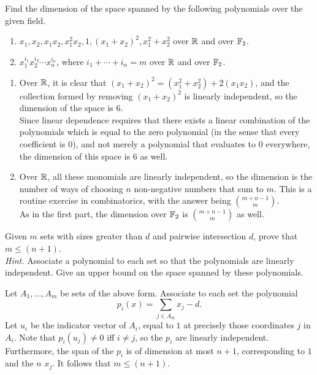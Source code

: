 \documentclass{article}
\begin{document}
	\begin{exercise}
		\label{ex:2.1}
		Find the dimension of the space spanned by the following polynomials over the given field.
		\begin{enumerate}[label=(\alph*)]
			\item $x_1, x_2, x_1x_2, x_1^2x_2, 1, (x_1+x_2)^2, x_1^2+x_2^2$ over $\mathbb{R}$ and over $\mathbb{F}_2$.
			\item $x_1^{i_1}x_2^{i_2}\cdots x_n^{i_n}$, where $i_1 + \cdots + i_n = m$ over $\mathbb{R}$ and over $\mathbb{F}_2$.
		\end{enumerate}
	\end{exercise}
	\begin{solution*}
		\begin{enumerate}[label=(\alph*)]
			\item Over $\mathbb{R}$, it is clear that $(x_1 + x_2)^2 = (x_1^2 + x_2^2) + 2(x_1x_2)$, and the collection formed by removing $(x_1 + x_2)^2$ is linearly independent, so the dimension of the space is $6$.\\
			Since linear dependence requires that there exists a linear combination of the polynomials which is equal to the zero polynomial (in the sense that every coefficient is $0$), and not merely a polynomial that evaluates to $0$ everywhere, the dimension of this space is $6$ as well.

			\item Over $\mathbb{R}$, all these monomials are linearly independent, so the dimension is the number of ways of choosing $n$ non-negative numbers that sum to $m$. This is a routine exercise in combinatorics, with the answer being $\binom{m+n-1}{m}$.\\
			As in the first part, the dimension over $\mathbb{F}_2$ is $\binom{m+n-1}{m}$ as well.
		\end{enumerate}
	\end{solution*}

	\begin{exercise}
		Given $m$ sets with sizes greater than $d$ and pairwise intersection $d$, prove that $m \le (n+1)$.\\
		\emph{Hint.} \textcolor{gray!20}{Associate a polynomial to each set so that the polynomials are linearly independent. Give an upper bound on the space spanned by these polynomials.}
	\end{exercise}
	\begin{solution*}
		Let $A_1,\ldots,A_m$ be sets of the above form. Associate to each set the polynomial
		\[ p_i(x) = \sum_{j \in A_m} x_j - d. \]
		Let $u_i$ be the indicator vector of $A_i$, equal to $1$ at precisely those coordinates $j$ in $A_i$. Note that $p_i(u_j) \ne 0$ iff $i \ne j$, so the $p_i$ are linearly independent. Furthermore, the span of the $p_i$ is of dimension at most $n+1$, corresponding to $1$ and the $n$ $x_j$. It follows that $m \le (n+1)$.
	\end{solution*}
\end{document}
